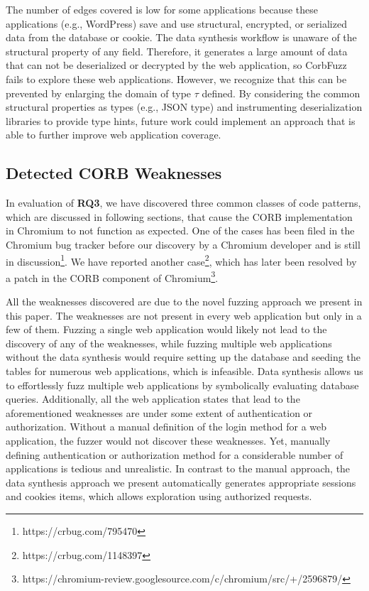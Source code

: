 \documentclass[10pt,conference]{IEEEtran}
\begin{document}
The number of edges covered is low for some applications because these applications (e.g., WordPress) save and use structural, encrypted, or serialized data from the database or cookie. The data synthesis workflow is unaware of the structural property of any field. Therefore, it generates a large amount of data that can not be deserialized or decrypted by the web application, so CorbFuzz fails to explore these web applications. However, we recognize that this can be prevented by enlarging the domain of type $\tau$ defined. By considering the common structural properties as types (e.g., JSON type) and instrumenting deserialization libraries to provide type hints, future work could implement an approach that is able to further improve web application coverage.

\subsection{Detected CORB Weaknesses}

In evaluation of {\bf RQ3}, we have discovered three common classes of code patterns, which are discussed in following sections, that cause the CORB implementation in Chromium to not function as expected. One of the cases has been filed in the Chromium bug tracker before our discovery by a Chromium developer and is still in discussion\footnote{https://crbug.com/795470}. We have reported another {case}\footnote{https://crbug.com/1148397}, which has later been resolved by a patch in the CORB component {of Chromium}\footnote{https://chromium-review.googlesource.com/c/chromium/src/+/2596879/}.


All the weaknesses discovered are due to the novel fuzzing approach we present in this paper. The weaknesses are not present in every web application but only in a few of them. Fuzzing a single web application would likely not lead to the discovery of any of the weaknesses, while fuzzing multiple web applications without the data synthesis would require setting up the database and seeding the tables for numerous web applications, which is infeasible. Data synthesis allows us to effortlessly fuzz multiple web applications by symbolically evaluating database queries. Additionally, all the web application states that lead to the aforementioned weaknesses are under some extent of authentication or authorization. Without a manual definition of the login method for a web application, the fuzzer would not discover these weaknesses. Yet, manually defining authentication or authorization method for a considerable number of applications is tedious and unrealistic. In contrast to the manual approach, the data synthesis approach we present automatically generates appropriate sessions and cookies items, which allows exploration using authorized requests.
\end{document}
